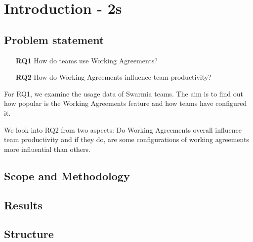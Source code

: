 
\chapter{Introduction - 2s}


\section{Problem statement}


\begin{enumerate}
    \item[{\bf RQ1}] How do teams use Working Agreements?
    \item[{\bf RQ2}] How do Working Agreements influence team productivity?
\end{enumerate}

For RQ1, we examine the usage data of Swarmia teams. The aim is to find out how popular is the Working Agreements feature and how teams have configured it. 

We look into RQ2 from two aspects: Do Working Agreements overall influence team productivity and if they do, are some configurations of working agreements more influential than others. 

\section{Scope and Methodology}

\section{Results}

\section{Structure}
